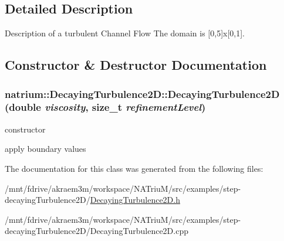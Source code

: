 \subsection{Detailed Description}
Description of a turbulent Channel Flow The domain is \mbox{[}0,5\mbox{]}x\mbox{[}0,1\mbox{]}. 

\subsection{Constructor \& Destructor Documentation}
\hypertarget{classnatrium_1_1DecayingTurbulence2D_af1aebee0f89465ec385a1a749f0ceb76}{
\subsubsection[{DecayingTurbulence2D}]{\setlength{\rightskip}{0pt plus 5cm}natrium::DecayingTurbulence2D::DecayingTurbulence2D (double {\em viscosity}, \/  size\_\-t {\em refinementLevel})}}
\label{classnatrium_1_1DecayingTurbulence2D_af1aebee0f89465ec385a1a749f0ceb76}


constructor 

apply boundary values 

The documentation for this class was generated from the following files:\begin{DoxyCompactItemize}
\item 
/mnt/fdrive/akraem3m/workspace/NATriuM/src/examples/step-\/decayingTurbulence2D/\hyperlink{DecayingTurbulence2D_8h}{DecayingTurbulence2D.h}\item 
/mnt/fdrive/akraem3m/workspace/NATriuM/src/examples/step-\/decayingTurbulence2D/DecayingTurbulence2D.cpp\end{DoxyCompactItemize}
